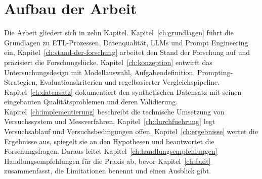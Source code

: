 \section{Aufbau der Arbeit}
\label{sec:aufbau}

Die Arbeit gliedert sich in zehn Kapitel. Kapitel~\ref{ch:grundlagen} führt die Grundlagen zu \ac{ETL}-Prozessen, Datenqualität, \acp{LLM} und Prompt Engineering ein, Kapitel~\ref{ch:stand-der-forschung} arbeitet den Stand der Forschung auf und präzisiert die Forschungslücke. Kapitel~\ref{ch:konzeption} entwirft das Untersuchungsdesign mit Modellauswahl, Aufgabendefinition, Prompting-Strategien, Evaluationskriterien und regelbasierter Vergleichspipeline. Kapitel~\ref{ch:datensatz} dokumentiert den synthetischen Datensatz mit seinen eingebauten Qualitätsproblemen und deren Validierung.
Kapitel~\ref{ch:implementierung} beschreibt die technische Umsetzung von Versuchssystem und Messverfahren, Kapitel~\ref{ch:durchfuehrung} legt Versuchsablauf und Versuchsbedingungen offen. Kapitel~\ref{ch:ergebnisse} wertet die Ergebnisse aus, spiegelt sie an den Hypothesen und beantwortet die Forschungsfragen. Daraus leitet Kapitel~\ref{ch:handlungsempfehlungen} Handlungsempfehlungen für die Praxis ab, bevor Kapitel~\ref{ch:fazit} zusammenfasst, die Limitationen benennt und einen Ausblick gibt.
